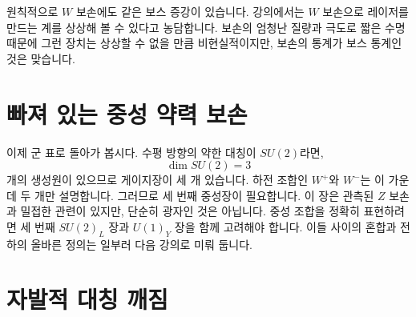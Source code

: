 원칙적으로 \(W\) 보손에도 같은 보스 증강이 있습니다. 강의에서는 \(W\) 보손으로 레이저를 만드는 계를 상상해 볼 수 있다고 농담합니다. 보손의 엄청난 질량과 극도로 짧은 수명 때문에 그런 장치는 상상할 수 없을 만큼 비현실적이지만, 보손의 통계가 보스 통계인 것은 맞습니다.

\begin{classroomqa}
\end{classroomqa}

\begin{classroomqa}\end{classroomqa}

\section{빠져 있는 중성 약력 보손}

이제 군 표로 돌아가 봅시다. 수평 방향의 약한 대칭이 \(SU(2)\)라면,
\begin{equation}
  \dim SU(2)=3
\end{equation}
개의 생성원이 있으므로 게이지장이 세 개 있습니다. 하전 조합인 \(W^+\)와 \(W^-\)는 이 가운데 두 개만 설명합니다. 그러므로 세 번째 중성장이 필요합니다.
이 장은 관측된 \(Z\) 보손과 밀접한 관련이 있지만, 단순히 광자인 것은 아닙니다. 중성 조합을 정확히 표현하려면 세 번째 \(SU(2)_L\) 장과 \(U(1)_Y\) 장을 함께 고려해야 합니다. 이들 사이의 혼합과 전하의 올바른 정의는 일부러 다음 강의로 미뤄 둡니다.

\section{자발적 대칭 깨짐}

